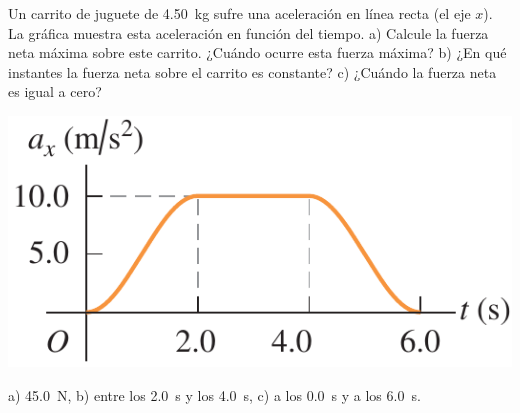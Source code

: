 \documentclass[11pt]{article}
\begin{document}
\begin{multicols}{2}
\begin{exercise}
    Un carrito de juguete de \qty{4.50}{kg} sufre una aceleración en línea recta (el eje $x$). La gráfica muestra esta aceleración en función del tiempo. a) Calcule la fuerza neta máxima sobre este carrito. ¿Cuándo ocurre esta fuerza máxima? b) ¿En qué instantes la fuerza neta sobre el carrito es constante? c) ¿Cuándo la fuerza neta es igual a cero?
    \begin{center}
        \includegraphics[scale=0.45]{figs/prob-01.png}
    \end{center}
\end{exercise}
\begin{solution}
    a) \qty{45.0}{N}, b) entre los \qty{2.0}{s} y los \qty{4.0}{s}, c) a los \qty{0.0}{s} y a los \qty{6.0}{s}.
\end{solution}
\end{multicols}
\end{document}
